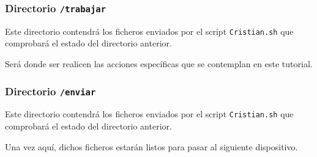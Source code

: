 \subsubsection{Directorio \texttt{/trabajar}}
Este directorio contendrá los ficheros enviados por el script \texttt{Cristian.sh} que comprobará el estado del directorio anterior.

Será donde ser realicen las acciones específicas que se contemplan en este tutorial.

\subsubsection{Directorio \texttt{/enviar}}
Este directorio contendrá los ficheros enviados por el script \texttt{Cristian.sh} que comprobará el estado del directorio anterior.

Una vez aquí, dichos ficheros estarán listos para pasar al siguiente dispositivo.



